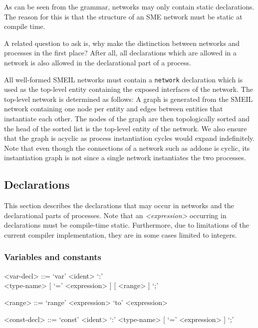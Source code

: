 As can be seen from the grammar, networks may only contain static
declarations. The reason for this is that the structure of an SME network must
be static at compile time. 

A related question to ask is, why make the distinction between networks and
processes in the first place? After all, all declarations which are allowed in
a network is also allowed in the declarational part of a process. 



All well-formed SMEIL networks must contain a {\tt network} declaration which is
used as the top-level entity containing the exposed interfaces of the
network. The top-level network is determined as follows: A graph is generated
from the SMEIL network containing one node per entity and edges between entities
that instantiate each other. The nodes of the graph are then topologically
sorted and the head of the sorted list is the top-level entity of the
network. We also ensure that the graph is acyclic as process instantiation
cycles would expand indefinitely. Note that even though the connections of a
network such as {\sc addone}  is cyclic, its
instantiation graph is not since a single network instantiates the two
processes.


\subsection{Declarations}
This section describes the declarations that may occur in {\ttfamily network}s
and the declarational parts of {\ttfamily processe}s. Note that an {\itshape
  <expression>} occurring in declarations must be compile-time
static. Furthermore, due to limitations of the current compiler implementation,
they are in some cases limited to integers.

\subsubsection{Variables and constants}
\begin{grammar}
  <var-decl> ::= `var' <ident> `:' \\ <type-name> [ `=' <expression> ] [ <range> ] `;'

  <range> ::= `range' <expression> `to' <expression>

  <const-decl> ::= `const' <ident> `:' <type-name> [ `=' <expression> ] `;'
\end{grammar}

